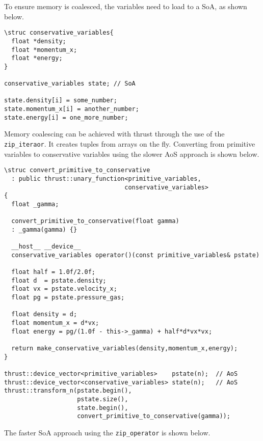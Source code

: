 To ensure memory is coalesced, the variables need to load to a SoA, as shown below.
\begin{lstlisting}
\struc conservative_variables{
  float *density;
  float *momentum_x;
  float *energy;
}

conservative_variables state; // SoA

state.density[i] = some_number;
state.momentum_x[i] = another_number;
state.energy[i] = one_more_number;
\end{lstlisting} 
Memory coalescing can be achieved with thrust through the use of the \verb+zip_iteraor+.  It creates tuples from arrays on the fly.  Converting from primitive variables to conservative variables using the slower AoS approach is shown below.
\begin{lstlisting}
\struc convert_primitive_to_conservative 
  : public thrust::unary_function<primitive_variables,
                                 conservative_variables>
{
  float _gamma;
  
  convert_primitive_to_conservative(float gamma)
  : _gamma(gamma) {}

  __host__ __device__
  conservative_variables operator()(const primitive_variables& pstate)

  float half = 1.0f/2.0f;
  float d  = pstate.density;
  float vx = pstate.velocity_x;
  float pg = pstate.pressure_gas;

  float density = d;
  float momentum_x = d*vx;
  float energy = pg/(1.0f - this->_gamma) + half*d*vx*vx;
  
  return make_conservative_variables(density,momentum_x,energy);
}

thrust::device_vector<primitive_variables>    pstate(n);  // AoS
thrust::device_vector<conservative_variables> state(n);   // AoS
thrust::transform_n(pstate.begin(),
                    pstate.size(),
                    state.begin(),
                    convert_primitive_to_conservative(gamma));
\end{lstlisting} 
The faster SoA approach using the \verb+zip_operator+ is shown below.
